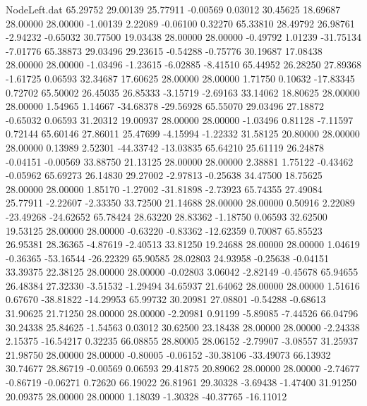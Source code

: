 \begin{filecontents}{NodeLeft.dat}
  65.29752   29.00139   25.77911    -0.00569    0.03012   30.45625   18.69687   28.00000   28.00000   -1.00139    2.22089   -0.06100    0.32270
  65.33810   28.49792   26.98761    -2.94232   -0.65032   30.77500   19.03438   28.00000   28.00000   -0.49792    1.01239  -31.75134   -7.01776
  65.38873   29.03496   29.23615    -0.54288   -0.75776   30.19687   17.08438   28.00000   28.00000   -1.03496   -1.23615   -6.02885   -8.41510
  65.44952   26.28250   27.89368    -1.61725    0.06593   32.34687   17.60625   28.00000   28.00000    1.71750    0.10632  -17.83345    0.72702
  65.50002   26.45035   26.85333    -3.15719   -2.69163   33.14062   18.80625   28.00000   28.00000    1.54965    1.14667  -34.68378  -29.56928
  65.55070   29.03496   27.18872    -0.65032    0.06593   31.20312   19.00937   28.00000   28.00000   -1.03496    0.81128   -7.11597    0.72144
  65.60146   27.86011   25.47699    -4.15994   -1.22332   31.58125   20.80000   28.00000   28.00000    0.13989    2.52301  -44.33742  -13.03835
  65.64210   25.61119   26.24878    -0.04151   -0.00569   33.88750   21.13125   28.00000   28.00000    2.38881    1.75122   -0.43462   -0.05962
  65.69273   26.14830   29.27002    -2.97813   -0.25638   34.47500   18.75625   28.00000   28.00000    1.85170   -1.27002  -31.81898   -2.73923
  65.74355   27.49084   25.77911    -2.22607   -2.33350   33.72500   21.14688   28.00000   28.00000    0.50916    2.22089  -23.49268  -24.62652
  65.78424   28.63220   28.83362    -1.18750    0.06593   32.62500   19.53125   28.00000   28.00000   -0.63220   -0.83362  -12.62359    0.70087
  65.85523   26.95381   28.36365    -4.87619   -2.40513   33.81250   19.24688   28.00000   28.00000    1.04619   -0.36365  -53.16544  -26.22329
  65.90585   28.02803   24.93958    -0.25638   -0.04151   33.39375   22.38125   28.00000   28.00000   -0.02803    3.06042   -2.82149   -0.45678
  65.94655   26.48384   27.32330    -3.51532   -1.29494   34.65937   21.64062   28.00000   28.00000    1.51616    0.67670  -38.81822  -14.29953
  65.99732   30.20981   27.08801    -0.54288   -0.68613   31.90625   21.71250   28.00000   28.00000   -2.20981    0.91199   -5.89085   -7.44526
  66.04796   30.24338   25.84625    -1.54563    0.03012   30.62500   23.18438   28.00000   28.00000   -2.24338    2.15375  -16.54217    0.32235
  66.08855   28.80005   28.06152    -2.79907   -3.08557   31.25937   21.98750   28.00000   28.00000   -0.80005   -0.06152  -30.38106  -33.49073
  66.13932   30.74677   28.86719    -0.00569    0.06593   29.41875   20.89062   28.00000   28.00000   -2.74677   -0.86719   -0.06271    0.72620
  66.19022   26.81961   29.30328    -3.69438   -1.47400   31.91250   20.09375   28.00000   28.00000    1.18039   -1.30328  -40.37765  -16.11012

\end{filecontents}
